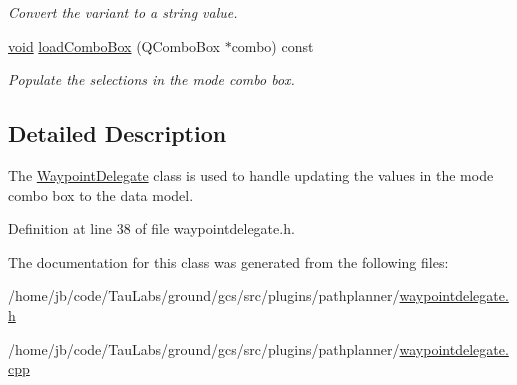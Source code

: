 \begin{DoxyCompactItemize}
\begin{DoxyCompactList}\small\item\em \-Convert the variant to a string value. \end{DoxyCompactList}\item 
\hyperlink{group___u_a_v_objects_plugin_ga444cf2ff3f0ecbe028adce838d373f5c}{void} \hyperlink{group___path_planner_ga2ea240fcdff4626ac277f5160f67f2e6}{load\-Combo\-Box} (\-Q\-Combo\-Box $\ast$combo) const 
\begin{DoxyCompactList}\small\item\em \-Populate the selections in the mode combo box. \end{DoxyCompactList}\end{DoxyCompactItemize}


\subsection{\-Detailed \-Description}
\-The \hyperlink{class_waypoint_delegate}{\-Waypoint\-Delegate} class is used to handle updating the values in the mode combo box to the data model. 

\-Definition at line 38 of file waypointdelegate.\-h.



\-The documentation for this class was generated from the following files\-:\begin{DoxyCompactItemize}
\item 
/home/jb/code/\-Tau\-Labs/ground/gcs/src/plugins/pathplanner/\hyperlink{waypointdelegate_8h}{waypointdelegate.\-h}\item 
/home/jb/code/\-Tau\-Labs/ground/gcs/src/plugins/pathplanner/\hyperlink{waypointdelegate_8cpp}{waypointdelegate.\-cpp}\end{DoxyCompactItemize}
